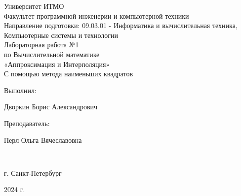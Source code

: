 \begin{center}
\hfill \break
\large{Университет ИТМО}\\
\large{Факультет программной инженерии и компьютерной техники}\\ 
\large{Направление подготовки: 09.03.01 - Информатика и вычислительная техника, Компьютерные системы и технологии}\\ 
\hfill\break
\hfill \break
\hfill \break
\hfill \break
\hfill \break
\hfill \break
\hfill \break
\hfill \break
\large{Лабораторная работа №1\\по Вычислительной математике\\«Аппроксимация и Интерполяция»\\С помощью метода наименьших квадратов}\\
\hfill \break
\hfill \break
\hfill \break
\hfill \break
\hfill \break
\end{center}
\hfill \break
\normalsize{ 
\begin{flushright}
Выполнил:
\par
Дворкин Борис Александрович
\par
Преподаватель:
\par
Перл Ольга Вячеславовна
\end{flushright}
}\\
\hfill \break
\hfill \break
\hfill \break
\hfill \break
\begin{center} г. Санкт-Петербург 
\par
2024 г. 
\end{center}
\thispagestyle{empty}
\thispagestyle{empty}
\thispagestyle{empty}